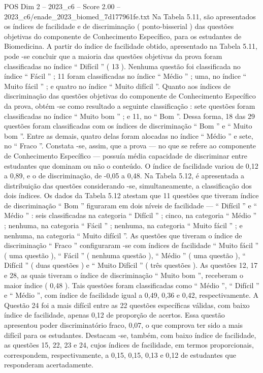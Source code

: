 \begin{textsample}{POS Dim 2 – 2023\_c6 – Score 2.00 – 2023\_c6/enade\_2023\_biomed\_7d177961fe.txt}
Na Tabela 5.11, são apresentados os índices de facilidade e de discriminação ( ponto-bisserial ) das questões objetivas do componente de Conhecimento Específico, para os estudantes de Biomedicina.
A partir do índice de facilidade obtido, apresentado na Tabela 5.11, pode -se concluir que a maioria das questões objetivas da prova foram classificadas no índice “ Difícil ” ( 13 ).
Nenhuma questão foi classificada no índice “ Fácil ” ; 11 foram classificadas no índice “ Médio ” ; uma, no índice “ Muito fácil ” ; e quatro no índice “ Muito difícil ”.
Quanto aos índices de discriminação das questões objetivas do componente de Conhecimento Específico da prova, obtém -se como resultado a seguinte classificação : sete questões foram classificadas no índice “ Muito bom ” ; e 11, no “ Bom ”.
Dessa forma, 18 das 29 questões foram classificadas com os índices de discriminação “ Bom ” e “ Muito bom ”.
Entre as demais, quatro delas foram alocadas no índice “ Médio ” e sete, no “ Fraco ”.
Constata -se, assim, que a prova — no que se refere ao componente de Conhecimento Específico — possuía média capacidade de discriminar entre estudantes que dominam ou não o conteúdo.
O índice de facilidade variou de 0,12 a 0,89, e o de discriminação, de -0,05 a 0,48.
Na Tabela 5.12, é apresentada a distribuição das questões considerando -se, simultaneamente, a classificação dos dois índices.
Os dados da Tabela 5.12 atestam que 11 questões que tiveram índice de discriminação “ Bom ” figuraram em dois níveis de facilidade — “ Difícil ” e “ Médio ” : seis classificadas na categoria “ Difícil ” ; cinco, na categoria “ Médio ” ; nenhuma, na categoria “ Fácil ” ; nenhuma, na categoria “ Muito fácil ” ; e nenhuma, na categoria “ Muito difícil ”.
As questões que tiveram o índice de discriminação “ Fraco ” configuraram -se com índices de facilidade “ Muito fácil ” ( uma questão ), “ Fácil ” ( nenhuma questão ), “ Médio ” ( uma questão ), “ Difícil ” ( duas questões ) e “ Muito Difícil ” ( três questões ).
As questões 12, 17 e 28, as quais tiveram o índice de discriminação “ Muito bom ”, receberam o maior índice ( 0,48 ).
Tais questões foram classificadas como “ Médio ”, “ Difícil ” e “ Médio ”, com índice de facilidade igual a 0,49, 0,36 e 0,42, respectivamente.
A Questão 24 foi a mais difícil entre as 22 questões específicas válidas, com baixo índice de facilidade, apenas 0,12 de proporção de acertos.
Essa questão apresentou poder discriminatório fraco, 0,07, o que comprova ter sido a mais difícil para os estudantes.
Destacam -se, também, com baixo índice de facilidade, as questões 15, 22, 23 e 24, cujos índices de facilidade, em termos proporcionais, correspondem, respectivamente, a 0,15, 0,15, 0,13 e 0,12 de estudantes que responderam acertadamente.

\end{textsample}
